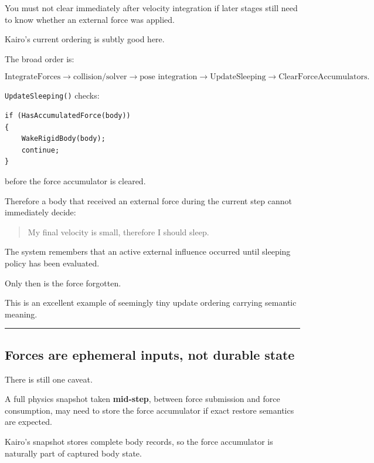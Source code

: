 You must not clear immediately after velocity integration if later stages still need to know whether an external force was applied.

Kairo's current ordering is subtly good here.

The broad order is:

\[
\text{IntegrateForces}
\rightarrow
\text{collision/solver}
\rightarrow
\text{pose integration}
\rightarrow
\text{UpdateSleeping}
\rightarrow
\text{ClearForceAccumulators}.
\]

\texttt{UpdateSleeping()} checks:

\begin{verbatim}
if (HasAccumulatedForce(body))
{
    WakeRigidBody(body);
    continue;
}
\end{verbatim}

before the force accumulator is cleared.

Therefore a body that received an external force during the current step cannot immediately decide:

\begin{quote}
My final velocity is small, therefore I should sleep.
\end{quote}

The system remembers that an active external influence occurred until sleeping policy has been evaluated.

Only then is the force forgotten.

This is an excellent example of seemingly tiny update ordering carrying semantic meaning.

\begin{center}\rule{0.5\linewidth}{0.5pt}\end{center}

\subsection{Forces are ephemeral inputs, not durable state}\label{06-engine-ii-ch038-forces-are-ephemeral-inputs-not-durable-state}

\hypertarget{06-engine-ii-ch038-forces-are-ephemeral-inputs-not-durable-state}{}

There is still one caveat.

A full physics snapshot taken \textbf{mid-step}, between force submission and force consumption, may need to store the force accumulator if exact restore semantics are expected.

Kairo's snapshot stores complete body records, so the force accumulator is naturally part of captured body state.

